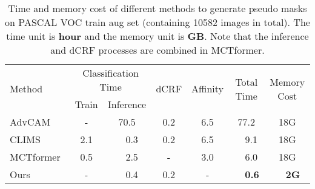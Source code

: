 \documentclass[10pt,twocolumn,letterpaper]{article}
\begin{document}
\begin{table*}[]
\centering
\begin{tabular}{lcccccc}
\toprule
\multirow{2}{*}{Method} & \multicolumn{2}{c}{Classification Time}                               & \multirow{2}{*}{dCRF} & \multirow{2}{*}{Affinity} & \multirow{2}{*}{Total Time} & \multirow{2}{*}{Memory Cost} \\ 
& \multicolumn{1}{c}{Train} & \multicolumn{1}{c}{Inference} & &  &  &  \\ 
\midrule
AdvCAM~\cite{Lee2021advcam}  & \multicolumn{1}{c}{-}  & \multicolumn{1}{c}{70.5}      & 0.2 & 6.5  & 77.2  & 18G     \\ CLIMS~\cite{Xie_2022_CLIMS}  & \multicolumn{1}{c}{2.1}   & \multicolumn{1}{c}{\ \ 0.3}       &   0.2  & 6.5  & \ \ 9.1  &   18G\\ MCTformer~\cite{xu2022mctformer}  & \multicolumn{1}{c}{0.5}   & \multicolumn{1}{c}{\ \ 2.5}  & -  & 3.0  & \ \ 6.0  &   18G  \\ Ours  & \multicolumn{1}{c}{-}     & \multicolumn{1}{c}{\ \ 0.4} & 0.2  & -  & \textbf{\ \ 0.6}& \textbf{\ \ 2G} \\ \bottomrule
\end{tabular}
\caption{Time and memory cost of different methods to generate pseudo masks on PASCAL VOC train aug set (containing 10582 images in total). The time unit is \textbf{hour} and the memory unit is \textbf{GB}. Note that the inference and dCRF processes are combined in MCTformer. }
\label{tab:time cost}
\end{table*}
\end{document}
